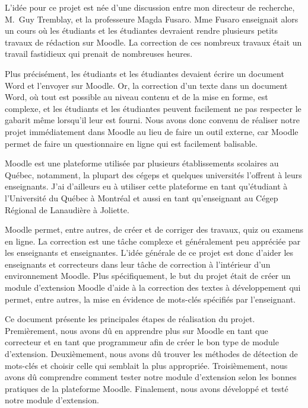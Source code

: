 \begin{introduction}

L'id\'ee pour ce projet est n\'ee d'une discussion entre mon directeur de recherche, M.\ Guy Tremblay, et la professeure Magda Fusaro.
Mme Fusaro enseignait alors un cours o\`u les \'etudiants et les \'etudiantes devraient rendre plusieurs petits travaux de r\'edaction sur Moodle.
La correction de ces nombreux travaux \'etait un travail fastidieux qui prenait de nombreuses heures.

Plus pr\'ecis\'ement, les \'etudiants et les \'etudiantes devaient \'ecrire un document Word et l'envoyer sur Moodle.
Or, la correction d'un texte dans un document Word, o\`u tout est possible au niveau contenu et de la mise en forme, est complexe,  et les \'etudiants et les \'etudiantes peuvent facilement ne pas respecter le gabarit m\^eme lorsqu'il leur est fourni.
Nous avons donc convenu de r\'ealiser notre projet imm\'ediatement dans Moodle au lieu de faire un outil externe, car Moodle permet de faire un questionnaire en ligne qui est facilement balisable.

Moodle est une plateforme utilisée par plusieurs établissements scolaires au Québec, notamment, la plupart des cégeps et quelques universités l'offrent à leurs enseignants.
J'ai d'ailleurs eu à utiliser cette plateforme en tant qu'étudiant à l'Université du Québec à Montréal et aussi en tant qu'enseignant au Cégep Régional de Lanaudière à Joliette.

Moodle permet, entre autres, de créer et de corriger des travaux, quiz ou examens en ligne.
La correction est une tâche complexe et g\'en\'eralement peu appréciée par les enseignants et enseignantes.
L'idée générale de ce projet est donc d'aider les enseignants et correcteurs dans leur tâche de correction à l'intérieur d'un environnement Moodle.
Plus sp\'ecifiquement, le but du projet \'etait de créer un module d'extension Moodle d'aide à la correction des textes à développement qui permet, entre autres, la mise en évidence de mots-clés sp\'ecifi\'es par l'enseignant.

Ce document pr\'esente les principales étapes de réalisation du projet.
Premièrement, nous avons d\^u en apprendre plus sur Moodle en tant que correcteur et en tant que programmeur afin de créer le bon type de module d'extension.
Deuxièmement, nous avons d\^u trouver les méthodes de détection de mots-clés et choisir celle qui semblait la plus appropri\'ee.
Troisièmement, nous avons d\^u comprendre comment tester notre module d'extension selon les bonnes pratiques de la plateforme Moodle.
Finalement, nous avons développ\'e et test\'e notre module d'extension.

\end{introduction}
